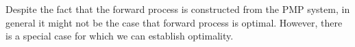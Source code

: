 \documentclass{article}
\begin{document}
Despite the fact that the forward process is constructed from the PMP system, in general it might not be the case that forward process is optimal. However, there is a special case for which we can establish optimality. 
\end{document}
